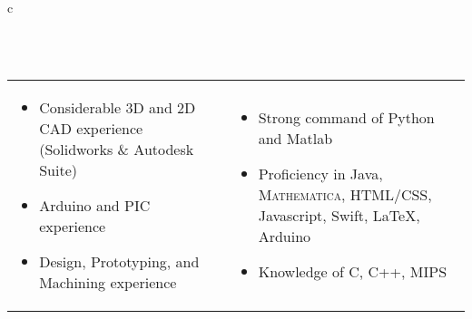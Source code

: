 \documentclass[11pt]{amsart}
\newcommand*\ruleline[1]{\par\noindent\raisebox{.8ex}{\makebox[\linewidth]{\hrulefill\hspace{1ex}\raisebox{-.8ex}{\Large~#1~}\hspace{1ex}\hrulefill}}\\ \-\ \vspace{-1em}}
\begin{document}
\begin{center}
\begin{tabular}{c}
	\ruleline{Skills}
	\begin{minipage}{\textwidth}
	\vspace{-1em}
	\begin{tabular}{p{}p{\dimexpr .5\textwidth-2\tabcolsep}}
			\begin{itemize}[leftmargin=*]
				\item Considerable 3D and 2D CAD experience \linebreak(Solidworks \& Autodesk Suite)
				\item Arduino and PIC experience
				\item Design, Prototyping, and Machining experience
			\end{itemize}
		&
			\begin{itemize}[leftmargin=*]
				\item Strong command of Python and Matlab
				\item Proficiency in Java, \textsc{Mathematica}, HTML/CSS, Javascript, Swift, \LaTeX, Arduino
				\item Knowledge of C, C++, MIPS
			\end{itemize}
	\end{tabular}
	\end{minipage}\\~ \vspace{-2em}\\
\end{tabular}\end{center}
\end{document}
